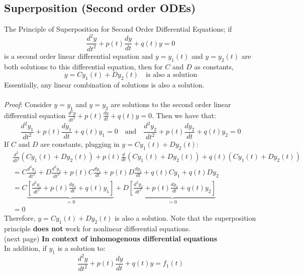 \documentclass{report}
\begin{document}
\subsection{Superposition (Second order ODEs)}%
The Principle of Superposition for Second Order Differential Equations; if
\begin{equation*}
\frac{d^2y}{dt^2}+p(t)\frac{dy}{dt}+q(t)y=0
\end{equation*}
is a second order linear differential equation and $y=y_1(t)$ and $y=y_2(t)$ are both
solutions to this differential equation, then for $C$ and $D$ as constants,
\begin{equation*}
y=Cy_1(t)+Dy_2(t)\quad\text{is also a solution}
\end{equation*}
Essentially, any linear combination of solutions is also a solution.\\
\vspace{1mm}\\
\textit{Proof}: Consider $y=y_1$ and $y=y_2$ are solutions to the second
order linear differential equation $\frac{d^2y}{dt^2}+p(t)\frac{dy}{dt}+q(t)y=0$. Then we have
that:
\begin{equation*}
\frac{d^2y_1}{dt^2}+p(t)\frac{dy_1}{dt}+q(t)y_1=0\quad\text{and}\quad\frac{d^2y_2}{dt^2}+p(t)\frac{dy_2}{dt}+q(t)y_2=0
\end{equation*}
If $C$ and $D$ are constants, plugging in $y=Cy_1(t)+Dy_2(t)$:
\begin{align*}
&\frac{d^2}{dt^2}(Cy_1(t)+Dy_2(t))+p(t)\frac{d}{dt}(Cy_1(t)+Dy_2(t))
+q(t)(Cy_1(t)+Dy_2(t))\\
&=C\frac{d^2y_1}{dt^2}+D\frac{d^2y_2}{dt^2}+p(t)C\frac{dy_1}{dt}+p(t)D\frac{dy_2}{dt}
+q(t)Cy_1+q(t)Dy_2\\
&=C\underbrace{\left[\frac{d^2y_1}{dt^2}+p(t)\frac{dy_1}{dt}+q(t)y_1\right]}_{=0}
+D\underbrace{\left[\frac{d^2y_2}{dt^2}+p(t)\frac{dy_2}{dt}+q(t)y_2\right]}_{=0}\\
&=0
\end{align*}
Therefore, $y=Cy_1(t)+Dy_2(t)$ is also a solution. Note that the superposition principle
\textbf{does not} work for nonlinear differential equations.\\
(next page)
\newpage
\noindent\textbf{In context of inhomogenous differential equations}\\ %
In addition, if $y_1$ is a solution to:
\begin{equation*}
\frac{d^2y}{dt^2}+p(t)\frac{dy}{dt}+q(t)y=f_1(t)
\end{equation*}
\end{document}

